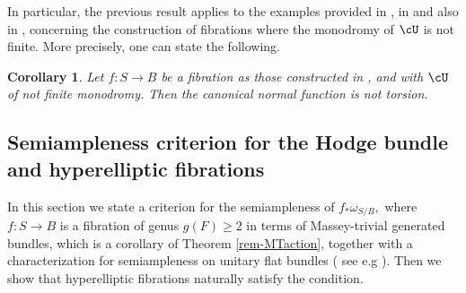 \documentclass[a4paper,11pt]{amsart}
\newtheorem{corollary}[theorem]{Corollary}
\begin{document}
{ 					 				In particular, the previous result applies to the examples provided in \cite{CatDet_TheDirectImage_2014}, in \cite{CD:Answer_2017} and also in \cite{CatDet_Vector_2016}, concerning the construction of fibrations where the monodromy of $\cU$ is not finite. More precisely, one can state the following.
 					 				\begin{corollary}\label{Cor-CataDetNFnotTor}
 					 					Let $f:S\to B$ be a fibration as those constructed in \cite{CatDet_TheDirectImage_2014}, \cite{CD:Answer_2017} and \cite{CatDet_Vector_2016} with $\cU$ of not finite monodromy. Then the canonical normal function is not torsion.
 					 					\end{corollary}
 					 				
 					 				
% 					 				
 					 			\subsection{Semiampleness criterion for the Hodge bundle and hyperelliptic fibrations}\label{SubSec-SemiamplenessCriteria}
 					 			In this section we state a criterion for the semiampleness of $f_*\omega_{S/B},$ where $f:S\to B$ is a fibration of genus $g(F)\geq 2$ in terms of Massey-trivial generated bundles, which is a corollary of Theorem \ref{rem-MTaction}, together with a characterization for semiampleness on unitary flat bundles ( see e.g \cite[Theorem 2.5]{CD:Answer_2017}). Then we show that hyperelliptic fibrations naturally satisfy the condition. 
 					 			
}
\end{document}
